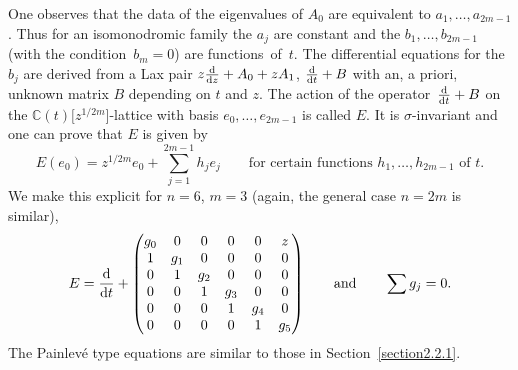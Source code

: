 \documentclass[10pt,a4paper]{amsart}
\numberwithin{equation}{section}
\begin{document}
 One observes that the data of the eigenvalues of $A_0$ are equivalent to $a_1,\dots , a_{2m-1}$. Thus for an
 isomonodromic family the $a_j$ are constant and the $b_1,\dots, b_{2m-1}$ (with the condition~${b_m=0}$)
 are functions~of~$t$. The differential equations for the $b_j$ are derived from a
 Lax pair $z\frac{{\rm d}}{{\rm d}z}+A_0+zA_1$, $ \frac{{\rm d}}{{\rm d}t}+B$ with an, a priori, unknown matrix $B$ depending on $t$ and $z$.
 The action of the operator~${\frac{{\rm d}}{{\rm d}t}+B}$ on the $\mathbb{C}(t)\bigl[z^{1/2m}\bigr]$-lattice with basis $e_0,\dots ,e_{2m-1}$ is called $E$. It is $\sigma$-invariant and one can prove that $E$ is given by
 \[ E(e_0)=z^{1/2m}e_0+\sum _{j=1}^{2m-1}h_je_j \qquad \mbox{for certain functions } h_1,\dots ,h_{2m-1} \mbox{ of } t.\]
 We make this explicit for $n=6$, $m=3$ (again, the general case $n=2m$ is similar),
 \[ E=\frac{{\rm d}}{{\rm d}t}+
\begin{pmatrix} g_0 &0 &0 &0 &0 &z \\
 1&g_1 &0 &0 &0 &0 \\
 0&1 &g_2 &0 &0 &0 \\
 0& 0& 1&g_3 &0 &0 \\
 0&0 &0&1 &g_4 &0 \\
 0&0 &0 & 0&1 &g _5\end{pmatrix}\qquad\mbox{and} \qquad\sum g_j=0. \]
The Painlev\'e type equations are similar to those in Section~\ref{section2.2.1}.
\end{document}
